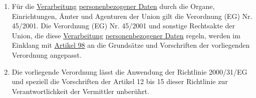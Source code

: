 \begin{commentblock}
\begin{enumerate}
  \item 
   Für die \hyperref[itm:04-2]{Verarbeitung} \hyperref[itm:04-1]{personenbezogener Daten} durch die Organe,
   Einrichtungen, Ämter und Agenturen der Union gilt die Verordnung (EG) Nr. 45/2001. 
   Die Verordnung (EG) Nr. 45/2001 und sonstige Rechtsakte der Union, die diese \hyperref[itm:04-2]
   {Verarbeitung} \hyperref[itm:04-1]{personenbezogener Daten} regeln, werden im Einklang mit \hyperref[ch:98]
   {Artikel 98} an die Grundsätze und Vorschriften der vorliegenden Verordnung angepasst.%
  \label{itm:02-3}

  \item 
   Die vorliegende Verordnung lässt die Anwendung der Richtlinie 2000/31/EG und speziell die Vorschriften der
   Artikel 12 bis 15 dieser Richtlinie zur Verantwortlichkeit der Vermittler unberührt.%
  \label{itm:02-4}

\end{enumerate}
\end{commentblock}

